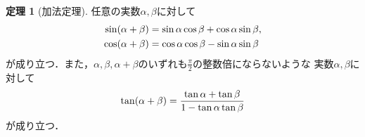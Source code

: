 \documentclass[11pt,a4paper]{ltjsarticle}
\theoremstyle{definition}
\newtheorem{thm}[dfn]{定理}
\begin{document}
\begin{thm}[加法定理] \label{thm:trigosum}
  任意の実数$\alpha, \beta$に対して
  \begin{align}
    \apply{\sin}{\alpha + \beta} & = \sin \alpha \cos \beta + \cos \alpha \sin \beta,
    \label{eq:sinsum}                                                                 \\
    \apply{\cos}{\alpha + \beta} & = \cos \alpha \cos \beta - \sin \alpha \sin \beta
    \label{eq:cossum}
  \end{align}
  が成り立つ．また，$\alpha, \beta , \alpha + \beta$のいずれも$\frac{\pi}{2}$の整数倍にならないような
  実数$\alpha, \beta$に対して
  \begin{align}
    \apply{\tan}{\alpha + \beta} = \frac{\tan \alpha + \tan \beta}{1 - \tan \alpha \tan \beta}
    \label{eq:tansum}
  \end{align}
  が成り立つ．
\end{thm}
\end{document}
